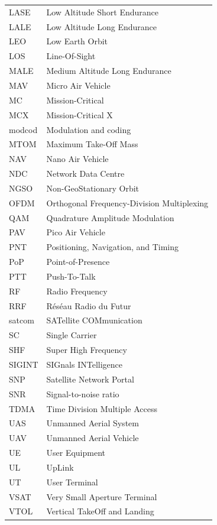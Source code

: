 \documentclass[english, 12pt, a4paper, elec, utf8, a-1b, online]{aaltothesis}
\begin{document}
\pagebreak

\begin{tabular}{ll}
LASE                    & Low Altitude Short Endurance \\
LALE                    & Low Altitude Long Endurance \\
LEO                     & Low Earth Orbit \\
LOS                     & Line-Of-Sight \\
MALE                    & Medium Altitude Long Endurance \\
MAV                     & Micro Air Vehicle \\
MC                      & Mission-Critical \\
MCX                     & Mission-Critical X \\
modcod                  & Modulation and coding \\
MTOM                    & Maximum Take-Off Mass \\
NAV                     & Nano Air Vehicle \\
NDC                     & Network Data Centre \\
NGSO                    & Non-GeoStationary Orbit \\
OFDM                    & Orthogonal Frequency-Division Multiplexing \\
QAM                     & Quadrature Amplitude Modulation \\
PAV                     & Pico Air Vehicle \\
PNT                     & Positioning, Navigation, and Timing \\
PoP                     & Point-of-Presence \\
PTT                     & Push-To-Talk \\
RF                      & Radio Frequency \\
RRF                     & Réséau Radio du Futur \\
satcom                  & SATellite COMmunication \\
SC                      & Single Carrier \\
SHF                     & Super High Frequency \\
SIGINT                  & SIGnals INTelligence \\
SNP                     & Satellite Network Portal \\
SNR                     & Signal-to-noise ratio \\
TDMA                    & Time Division Multiple Access \\
UAS                     & Unmanned Aerial System \\
UAV                     & Unmanned Aerial Vehicle \\
UE                      & User Equipment \\
UL                      & UpLink \\
UT                      & User Terminal \\
VSAT                    & Very Small Aperture Terminal \\
VTOL                    & Vertical TakeOff and Landing
\end{tabular}
\end{document}
